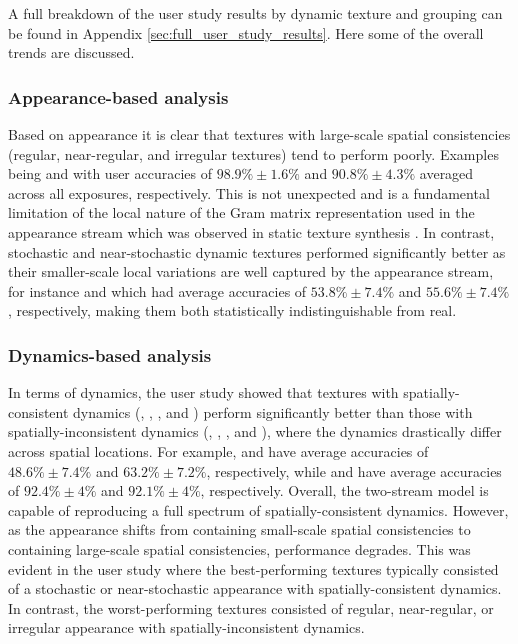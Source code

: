 

A full breakdown of the user study results by dynamic texture and 
grouping can be found in Appendix \ref{sec:full_user_study_results}.
Here some of the overall trends are discussed.

\subsubsection{Appearance-based analysis}

Based on appearance it is clear that textures with
large-scale spatial consistencies (regular, near-regular, 
and irregular textures) tend to perform poorly.
Examples being  and  with
user accuracies of $98.9\% \pm 1.6\%$ and $90.8\% \pm 4.3\%$ 
averaged across all exposures, respectively.
This is not unexpected and is a fundamental limitation of the 
local nature of the Gram matrix representation used in the 
appearance stream which was observed in static texture synthesis 
\cite{gatys2015}.
In contrast, stochastic and near-stochastic dynamic textures 
performed significantly better as their smaller-scale local 
variations are well captured by the appearance stream, for 
instance  and  which had 
average accuracies of $53.8\% \pm 7.4\%$ and
$55.6\% \pm 7.4\%$, respectively, making them both 
statistically indistinguishable from real.

\subsubsection{Dynamics-based analysis}

In terms of dynamics, the user study showed that textures with
spatially-consistent dynamics (\eg, , 
, and  ) perform 
significantly better than those with spatially-inconsistent 
dynamics (\eg, , , 
and ), where the dynamics drastically differ 
across spatial locations.
For example,  and 
have average accuracies of $48.6\% \pm 7.4\%$ and
$63.2\% \pm 7.2\%$, respectively, while
 and  have average 
accuracies of $92.4\% \pm 4\%$ and $92.1\% \pm 4\%$, 
respectively.
Overall, the two-stream model is capable of reproducing a full spectrum
of spatially-consistent dynamics.
However, as the appearance shifts from containing small-scale 
spatial consistencies to containing large-scale spatial consistencies,
performance degrades.
This was evident in the user study where the best-performing 
textures typically consisted of a stochastic or
near-stochastic appearance with spatially-consistent 
dynamics.
In contrast, the worst-performing textures consisted of
regular, near-regular, or irregular appearance with
spatially-inconsistent dynamics.

